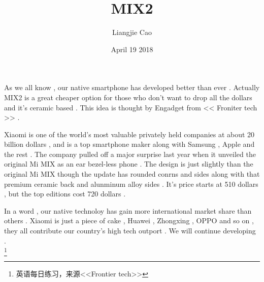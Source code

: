 \documentclass[50pt]{article}
\begin{document}
\title{MIX2}
\author{Liangjie Cao}
\date{April 19 2018}
\maketitle
\par
As we all know , our native smartphone has developed better than ever . Actually MIX2 is a great cheaper option for those who don't want to drop all the dollars and it's ceramic based . This idea is thought by Engadget from << Froniter tech >> . \\
\par
Xiaomi is one of the world's most valuable privately held companies at about 20 billion dollars , and is a top smartphone maker along with Samsung , Apple and the rest . The company pulled  off a major surprise last year when it unveiled the original Mi MIX as an ear bezel-less phone . The design is just slightly than the original Mi MIX  though the update has rounded conrns and sides along with that premium ceramic back and alunminum alloy sides . It's price starts at 510 dollars , but the top editions cost 720 dollars . \\
\par
In a word , our native technoloy  has gain more international market share than others . Xiaomi is just a piece of cake , Huawei , Zhongxing , OPPO and so on , they all contribute our country's high tech outport . We will continue developing . \\
\footnote{\centering 英语每日练习，来源<<Frontier tech>>}
\end{document}

